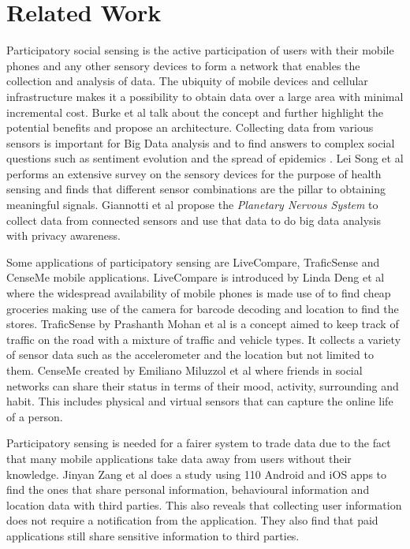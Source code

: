 \chapter{Related Work}

Participatory social sensing is the active participation of users with their mobile phones and any other sensory devices to form a network that enables the collection and analysis of data. The ubiquity of mobile devices and cellular infrastructure makes it a possibility to obtain data over a large area with minimal incremental cost. Burke et al talk about the concept \cite{burke2006participatory} and further highlight the potential benefits and propose an architecture. Collecting data from various sensors is important for Big Data analysis and to find answers to complex social questions such as sentiment evolution and the spread of epidemics \cite{giannotti2012planetary}. Lei Song et al \cite{song2014health} performs an extensive survey on the sensory devices for the purpose of health sensing and finds that different sensor combinations are the pillar to obtaining meaningful signals. Giannotti et al \cite{giannotti2012planetary} propose the \textit{Planetary Nervous System} to collect data from connected sensors and use that data to do big data analysis with privacy awareness.

Some applications of participatory sensing are LiveCompare, TraficSense and CenseMe mobile applications. LiveCompare is introduced by Linda Deng et al
\cite{deng2009livecompare} where the widespread availability of mobile phones is made use of to find cheap groceries making use of the camera for barcode decoding and location to find the stores. TraficSense by Prashanth Mohan et al \cite{mohan2008nericell} is a concept aimed to keep track of traffic on the road with a mixture of traffic and vehicle types. It collects a variety of sensor data such as the accelerometer and the location but not limited to them. CenseMe created by Emiliano Miluzzol et al \cite{miluzzo2007cenceme} where friends in social networks can share their status in terms of their mood, activity, surrounding and habit. This includes physical and virtual sensors that can capture the online life of a person. 

Participatory sensing is needed for a fairer system to trade data due to the fact that many mobile applications take data away from users without their knowledge. Jinyan Zang et al
\cite{zang2015knows} does a study using 110 Android and iOS apps to find the ones that share personal information, behavioural information and location data with third parties. This also reveals that collecting user information does not require a notification from the application. They also find that paid applications still share sensitive information to third parties. 

